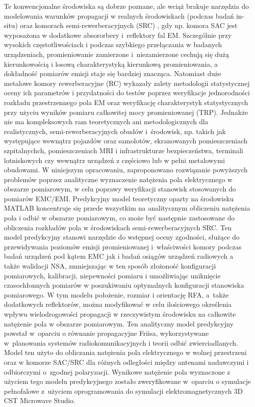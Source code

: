 Te konwencjonalne środowiska są dobrze poznane, ale wciąż brakuje narzędzia do modelowania warunków propagacji w realnych środowiskach (podczas badań in-situ) oraz komorach semi-rewerberacyjnych (SRC) \cite{6WILSON6,7KOEPKE7,8JANSSON8,9ROWELL9}, gdy np. komora SAC jest wyposażona w dodatkowe absororbery i~reflektory fal EM. Szczególnie przy wysokich częstotliwościach i podczas szybkiego przełączania w badanych urządzeniach, promieniowanie zamierzone i~niezamierzone cechują się dużą kierunkowością i losową charakterystyką kierunkową promieniowania, a dokładność pomiarów emisji staje się bardziej znacząca. Natomiast duże metalowe komory rewerberacyjne (RC) \cite{5VOGT5,10SERRA10,11HILL11,12MIGLIACCIO12,13MIGLIACCIO13,14CORONA14} wykazały zalety metodologii statystycznej oceny ich parametrów i przydatności do testów poprzez weryfikacje jednorodności rozkładu przestrzennego pola EM oraz weryfikację charakterystyk statystycznych przy użyciu wyników pomiaru całkowitej mocy promieniowanej (TRP). Jednakże nie ma kompleksowych ram teoretycznych ani metodologicznych dla realistycznych, semi-rewerberacyjnych obudów i~środowisk, np. takich jak występujące wewnątrz pojazdów oraz samolotów, ekranowanych pomieszczeniach szpitalnychch, pomieszczeniach MRI i infrastrukturze bezpieczeństwa, terminali lotniskowych czy wewnątrz urządzeń z częściowo lub w pełni metalowymi obudowami.
W niniejszym opracowaniu, zaproponowano rozwiązanie powyższych problemów poprzez analityczne wyznaczenie natężenia pola elektrycznego w obszarze pomiarowym, w celu poprawy weryfikacji stanowisk stosowanych do pomiarów EMC/EMI. Predykcyjny model teoretyczny oparty na środowisku MATLAB koncentruje się przede wszystkim na analitycznym obliczeniu natężenia pola i odbić w obszarze pomiarowym, co może być następnie zastosowane do obliczenia rozkładów pola w środowiskach semi-rewerberacyjnych SRC. Ten model predykcyjny stanowi narzędzie do wstępnej oceny zgodności, służące do przewidywania poziomów emisji promieniowanej i~właściwości komory podczas badań urządzeń pod kątem EMC jak i badań osiągów urządzeń radiowych a także walidacji NSA, zmniejszając w ten sposób złożoność konfiguracji pomiarowych, kalibracji, niepewności pomiaru i umożliwiając uniknięcie czasochłonnych pomiarów w poszukiwaniu optymalnych konfiguracji stanowiska pomiarowego. W tym modelu położenie, rozmiar i orientację RFA, a~także dodatkowych reflektorów, można modyfikować w celu ilościowego określenia wpływu wielodrogowości propagacji w rzeczywistym środowisku na całkowite natężenie pola w obszarze pomiarowym. Ten analityczny model predykcyjny powstał w~oparciu o równanie propagacyjne Friisa, wykorzystywane w~planowania systemów radiokomunikacyjnych i teorii odbić zwierciadlanych. Model ten użyto do obliczania natężenia pola elektrycznego w wolnej przestrzeni oraz w komorze SAC/SRC dla różnych odległości między antenami nadawczymi i odbiorczymi o~zgodnej polaryzacji. Wynikowe natężenie pola wyznaczone z użyciem tego modelu predykcyjnego zostało zweryfikowane w~oparciu o symulacje pełnofalowe z~użyciem oprogramowania do symulacji elektromagnetycznych 3D CST Microwave Studio.


